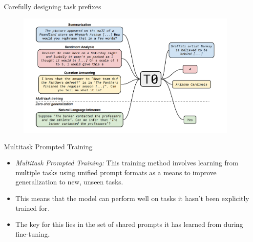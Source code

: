 
\begin{frame}{Carefully designing task prefixes}

\vfill
	
	\begin{figure}
		\centering
		\includegraphics[width = 11cm]{figure/81-t0.png}\\ 
	\end{figure}

\vfill

\end{frame}


\begin{frame}{Multitask Prompted Training}

\vfill

\begin{itemize}
    \item \textit{Multitask Prompted Training:} This
    training method involves learning from multiple
    tasks using unified prompt formats as a means to improve
    generalization to new, unseen tasks.
    \item This means that the model can perform well on tasks it hasn't been explicitly trained for.
    \item The key for this lies in the set of shared prompts it has learned from during fine-tuning.
\end{itemize}

\vfill

\end{frame}


